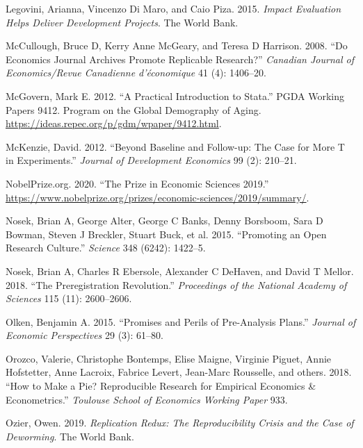 \documentclass[
]{book}
\begin{document}
\leavevmode\hypertarget{ref-legovini2015impact}{}%
Legovini, Arianna, Vincenzo Di Maro, and Caio Piza. 2015. \emph{Impact Evaluation Helps Deliver Development Projects}. The World Bank.

\leavevmode\hypertarget{ref-mccullough2008economics}{}%
McCullough, Bruce D, Kerry Anne McGeary, and Teresa D Harrison. 2008. ``Do Economics Journal Archives Promote Replicable Research?'' \emph{Canadian Journal of Economics/Revue Canadienne d'économique} 41 (4): 1406--20.

\leavevmode\hypertarget{ref-RePEc:gdm:wpaper:9412}{}%
McGovern, Mark E. 2012. ``A Practical Introduction to Stata.'' PGDA Working Papers 9412. Program on the Global Demography of Aging. \url{https://ideas.repec.org/p/gdm/wpaper/9412.html}.

\leavevmode\hypertarget{ref-mckenzie2012beyond}{}%
McKenzie, David. 2012. ``Beyond Baseline and Follow-up: The Case for More T in Experiments.'' \emph{Journal of Development Economics} 99 (2): 210--21.

\leavevmode\hypertarget{ref-nobel2019}{}%
NobelPrize.org. 2020. ``The Prize in Economic Sciences 2019.'' \url{https://www.nobelprize.org/prizes/economic-sciences/2019/summary/}.

\leavevmode\hypertarget{ref-nosek2015promoting}{}%
Nosek, Brian A, George Alter, George C Banks, Denny Borsboom, Sara D Bowman, Steven J Breckler, Stuart Buck, et al. 2015. ``Promoting an Open Research Culture.'' \emph{Science} 348 (6242): 1422--5.

\leavevmode\hypertarget{ref-nosek2018preregistration}{}%
Nosek, Brian A, Charles R Ebersole, Alexander C DeHaven, and David T Mellor. 2018. ``The Preregistration Revolution.'' \emph{Proceedings of the National Academy of Sciences} 115 (11): 2600--2606.

\leavevmode\hypertarget{ref-olken2015promises}{}%
Olken, Benjamin A. 2015. ``Promises and Perils of Pre-Analysis Plans.'' \emph{Journal of Economic Perspectives} 29 (3): 61--80.

\leavevmode\hypertarget{ref-orozco2018make}{}%
Orozco, Valerie, Christophe Bontemps, Elise Maigne, Virginie Piguet, Annie Hofstetter, Anne Lacroix, Fabrice Levert, Jean-Marc Rousselle, and others. 2018. ``How to Make a Pie? Reproducible Research for Empirical Economics \& Econometrics.'' \emph{Toulouse School of Economics Working Paper} 933.

\leavevmode\hypertarget{ref-ozier2019replication}{}%
Ozier, Owen. 2019. \emph{Replication Redux: The Reproducibility Crisis and the Case of Deworming}. The World Bank.
\end{document}
